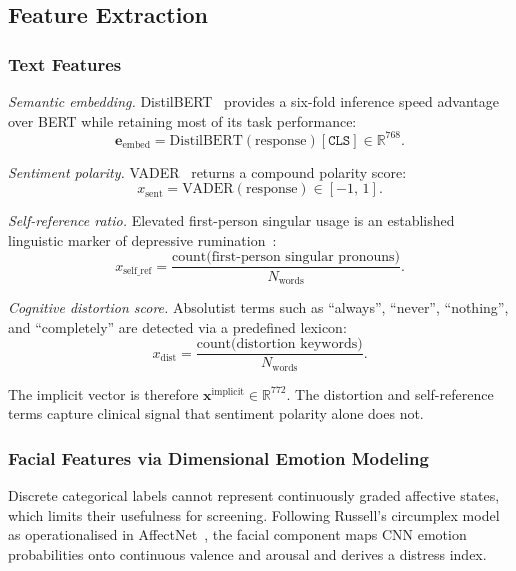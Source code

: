 \documentclass[12pt]{article}
\begin{document}
\subsection{Feature Extraction}

\subsubsection{Text Features}

\emph{Semantic embedding.} DistilBERT~\cite{sanh2019distilbert} provides
a six-fold inference speed advantage over BERT while retaining most of
its task performance:
\begin{equation}
\mathbf{e}_{\text{embed}} = \text{DistilBERT}(\text{response})[\texttt{CLS}]
\in \mathbb{R}^{768}.
\end{equation}

\emph{Sentiment polarity.} VADER~\cite{hutto2014vader} returns a
compound polarity score:
\begin{equation}
x_{\text{sent}} = \text{VADER}(\text{response}) \in [-1,\,1].
\end{equation}

\emph{Self-reference ratio.} Elevated first-person singular usage is an
established linguistic marker of depressive
rumination~\cite{coppersmith2015mental}:
\begin{equation}
x_{\text{self\_ref}}
= \frac{\text{count(first-person singular pronouns)}}
       {N_{\text{words}}} .
\end{equation}

\emph{Cognitive distortion score.} Absolutist terms such as ``always'',
``never'', ``nothing'', and ``completely'' are detected via a predefined
lexicon:
\begin{equation}
x_{\text{dist}}
= \frac{\text{count(distortion keywords)}}{N_{\text{words}}} .
\end{equation}

\noindent The implicit vector is therefore
$\mathbf{x}^{\text{implicit}}\in\mathbb{R}^{772}$. The distortion and
self-reference terms capture clinical signal that sentiment polarity
alone does not.

\subsubsection{Facial Features via Dimensional Emotion Modeling}

Discrete categorical labels cannot represent continuously graded
affective states, which limits their usefulness for screening. Following
Russell's circumplex model~\cite{russell1980circumplex} as operationalised
in AffectNet~\cite{mollahosseini2017affectnet}, the facial component maps
CNN emotion probabilities onto continuous valence and arousal and
derives a distress index.
\end{document}
